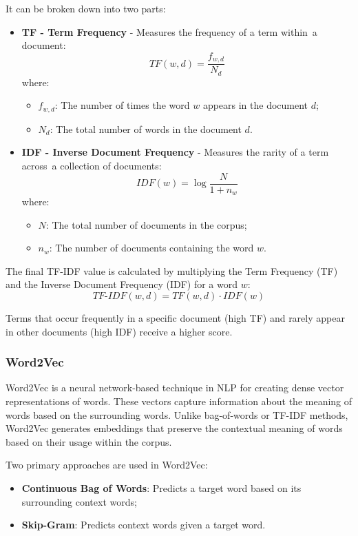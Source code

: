 It can be broken down into two parts:


\begin{itemize}
  \item \textbf{TF - Term Frequency} - Measures the frequency of a term
    within~a document:
  \[
  TF(w, d) = \frac{f_{w, d}}{N_d}
  \]
  where:
  \begin{itemize}
    \item \( f_{w, d} \): The number of times the word \( w \) appears in the
      document \( d \);
    \item \( N_d \): The total number of words in the document \( d \).
  \end{itemize}

  \item \textbf{IDF - Inverse Document Frequency} - Measures the rarity of a
    term across~a collection of documents:
  \[
  IDF(w) = \log{\frac{N}{1 + n_w}}
  \]
  where:
  \begin{itemize}
    \item \( N \): The total number of documents in the corpus;
    \item \( n_w \): The number of documents containing the word \( w \).
  \end{itemize}
\end{itemize}


The final TF-IDF value is calculated by multiplying the Term Frequency (TF) and
the Inverse Document Frequency (IDF) for a word \( w \):  
\[  
TF\text{-}IDF(w, d) = TF(w, d) \cdot IDF(w)  
\]  

Terms that occur frequently in a specific document (high TF) and rarely appear
in other documents (high IDF) receive a higher score.

\subsubsection*{Word2Vec}

Word2Vec is a neural network-based technique in NLP for creating dense vector
representations of words. These vectors capture information about the meaning
of words based on the surrounding words. Unlike bag-of-words or TF-IDF methods,
Word2Vec generates embeddings that preserve the contextual meaning of words
based on their usage within the corpus. \cite{w2v}

Two primary approaches are used in Word2Vec: 
\begin{itemize} 
  \item \textbf{Continuous Bag of Words}: Predicts a target word based
    on its surrounding context words;
  \item \textbf{Skip-Gram}: Predicts context words given a target word.
\end{itemize}

